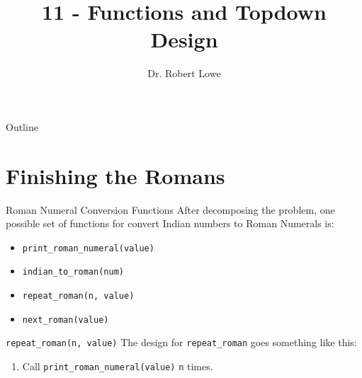 \documentclass[]{beamer}
\title{11 - Functions and Topdown Design}
\author{Dr. Robert Lowe\\}
\institute[Maryville College] %
{
  Division of Mathematics and Computer Science\\
  Maryville College
}
\date[]{}
\begin{document}
\begin{frame}
  \titlepage
\end{frame}

\begin{frame}{Outline}
  \tableofcontents
\end{frame}





\section{Finishing the Romans}
\begin{frame}{Roman Numeral Conversion Functions}
    After decomposing the problem, one possible set of functions
    for convert Indian numbers to Roman Numerals is:
    \begin{itemize}[<+(1)->]
        \item \texttt{print\_roman\_numeral(value)}
        \item \texttt{indian\_to\_roman(num)}
        \item \texttt{repeat\_roman(n, value)}
        \item \texttt{next\_roman(value)}
    \end{itemize}
\end{frame}

\begin{frame}{\texttt{repeat\_roman(n, value)}}
    The design for \texttt{repeat\_roman} goes something like this:
    \begin{enumerate}[<+(2)->]
        \item Call \texttt{print\_roman\_numeral(value)} \texttt{n}
            times.
    \end{enumerate}
\end{frame}
\end{document}

